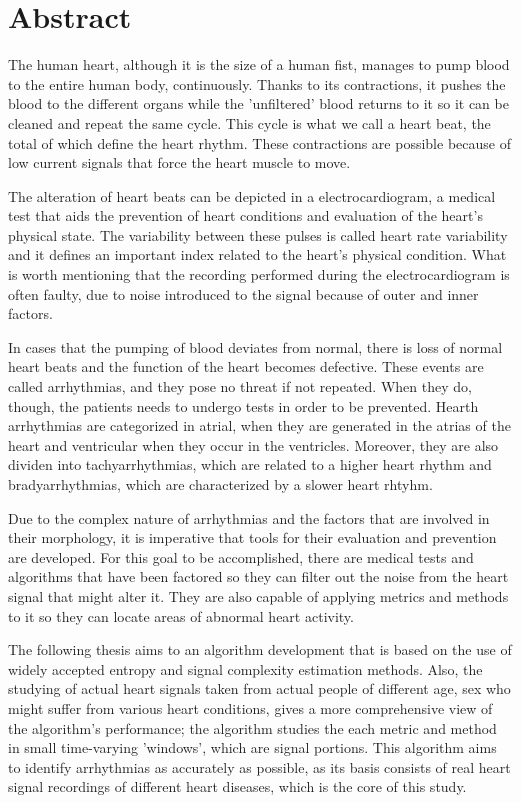 \en
\chapter*{Abstract}
The human heart, although it is the size of a human fist, manages to pump blood to the entire human body, continuously. Thanks to its contractions, it pushes the blood to the different organs while the 'unfiltered' blood returns to it so it can be cleaned and repeat the same cycle. This cycle is what we call a heart beat, the total of  which define the heart rhythm.  These contractions are possible because of low current signals that force the heart muscle to move.
\par
The alteration of heart beats can be depicted in a electrocardiogram, a medical test that aids the prevention of heart conditions and evaluation of the heart's physical state. The variability between these pulses is called heart rate variability and it defines an important index related to the heart's physical condition. What is worth mentioning that the recording performed during the electrocardiogram is often faulty, due to noise introduced to the signal because of outer and inner factors. 
\par
In cases that the pumping of blood deviates from normal, there is loss of normal heart beats and the function of the heart becomes defective. These events are called arrhythmias, and they pose no threat if not repeated. When they do, though, the patients needs to undergo tests in order to be prevented. Hearth arrhythmias are categorized in atrial, when they are generated in the atrias of the heart and ventricular when they occur in the ventricles. Moreover, they are also dividen into tachyarrhythmias, which are related to a higher heart rhythm and bradyarrhythmias, which are characterized by a slower heart rhtyhm.
\par
Due to the complex nature of arrhythmias and the factors that are involved in their morphology, it is imperative that tools for their evaluation and prevention are developed. For this goal to be accomplished, there are medical tests and algorithms that have been factored so they can filter out the noise from the heart signal that might alter it. They are also capable of applying metrics and methods to it so they can locate areas of abnormal heart activity.
\par
The following thesis aims to an algorithm development that is based on the use of widely accepted entropy and signal complexity estimation methods. Also, the studying of actual heart signals taken from actual people of different age, sex who might suffer from various heart conditions, gives a more comprehensive view of the algorithm's performance; the algorithm studies the each metric and method in small time-varying 'windows', which are signal portions. This algorithm aims to identify arrhythmias as accurately as possible, as its basis consists of real heart signal recordings of different heart diseases, which is the core of this study.